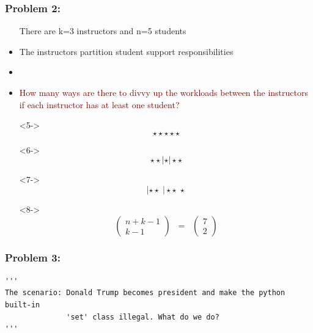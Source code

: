 \documentclass[xcolor={dvipsnames}]{beamer}
\begin{document}
\frame
{
 \frametitle{Problem 2:}

\vspace{-1em}
\begin{itemize}
\item[] There are k=3 instructors and n=5 students %
\item<2->[] The instructors partition student support responsibilities 
\item<3->[] [i.e., each instructor only works with ``their students''] 
\item<4-> \textcolor{Maroon}{How many ways are there to divvy up the workloads between the instructors if each instructor has at least one student?}
\vspace{-2.25em}
\item[]<5-> \huge $$\star\star\star\star\star$$ %
\vspace{-3em}
\item[]<6->\huge $$\star\star|\star|\star\star$$ %
\vspace{-3em}
\item[]<7->\huge $$|\star\star\;|\star\star\;\star$$ %
\vspace{-1.5em}
\item[]<8->$$  \left(\begin{array}{c} n+k-1 \\ k-1\end{array}\right) \;\;= \;\; \left(\begin{array}{c} 7 \\ 2\end{array}\right)$$
\end{itemize}

\vspace{-.25em}
}


\begin{frame}[fragile]
 \frametitle{Problem 3:}

\scriptsize

\begin{verbatim}
'''
The scenario: Donald Trump becomes president and make the python built-in
              'set' class illegal. What do we do?
'''
\end{verbatim}
\end{frame}
\end{document}
